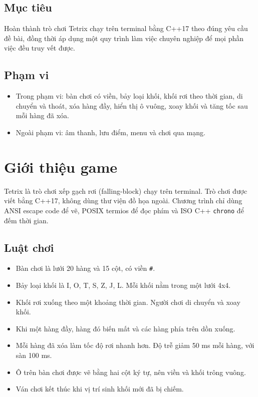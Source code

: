 \documentclass[12pt,a4paper]{article}
\begin{document}
\subsection{Mục tiêu}

Hoàn thành trò chơi Tetrix chạy trên terminal bằng C++17 theo đúng yêu cầu đề bài,
đồng thời áp dụng một quy trình làm việc chuyên nghiệp để mọi phần việc đều truy
vết được.

\subsection{Phạm vi}

\begin{itemize}
  \item Trong phạm vi: bàn chơi có viền, bảy loại khối, khối rơi theo thời gian,
        di chuyển và thoát, xóa hàng đầy, hiển thị ô vuông, xoay khối và tăng tốc
        sau mỗi hàng đã xóa.
  \item Ngoài phạm vi: âm thanh, lưu điểm, menu và chơi qua mạng.
\end{itemize}
\section{Giới thiệu game}

Tetrix là trò chơi xếp gạch rơi (falling-block) chạy trên terminal. Trò chơi
được viết bằng C++17, không dùng thư viện đồ họa ngoài. Chương trình chỉ dùng
ANSI escape code để vẽ, POSIX termios để đọc phím và ISO C++ \texttt{chrono} để
đếm thời gian.

\subsection{Luật chơi}

\begin{itemize}
  \item Bàn chơi là lưới 20 hàng và 15 cột, có viền \texttt{\#}.
  \item Bảy loại khối là I, O, T, S, Z, J, L. Mỗi khối nằm trong một lưới 4x4.
  \item Khối rơi xuống theo một khoảng thời gian. Người chơi di chuyển và xoay khối.
  \item Khi một hàng đầy, hàng đó biến mất và các hàng phía trên dồn xuống.
  \item Mỗi hàng đã xóa làm tốc độ rơi nhanh hơn. Độ trễ giảm 50 ms mỗi hàng, với sàn 100 ms.
  \item Ô trên bàn chơi được vẽ bằng hai cột ký tự, nên viền và khối trông vuông.
  \item Ván chơi kết thúc khi vị trí sinh khối mới đã bị chiếm.
\end{itemize}
\end{document}
